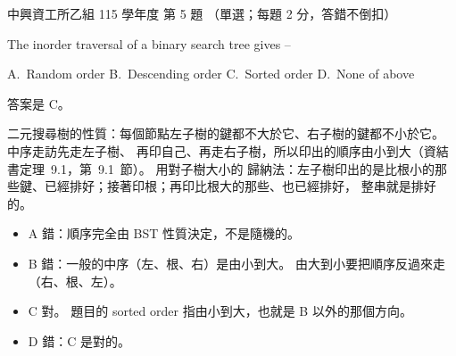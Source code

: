 \begin{pastexam}[label={px:nchu-115-is-05}]{中興資工所乙組 115 學年度 第 5 題}
（單選；每題 2 分，答錯不倒扣）

The inorder traversal of a binary search tree gives --

A.~Random order \qquad B.~Descending order \qquad C.~Sorted order \qquad D.~None of above
\end{pastexam}

\begin{pastsoln}
答案是 C。

二元搜尋樹的性質：每個節點左子樹的鍵都不大於它、右子樹的鍵都不小於它。 中序走訪先走左子樹、
再印自己、再走右子樹，所以印出的順序由小到大（資結書定理~9.1，第~9.1~節）。 用對子樹大小的
歸納法：左子樹印出的是比根小的那些鍵、已經排好；接著印根；再印比根大的那些、也已經排好，
整串就是排好的。
\begin{itemize}
\item A 錯：順序完全由 BST 性質決定，不是隨機的。
\item B 錯：一般的中序（左、根、右）是由小到大。 由大到小要把順序反過來走（右、根、左）。
\item C 對。 題目的 sorted order 指由小到大，也就是 B 以外的那個方向。
\item D 錯：C 是對的。
\end{itemize}
\end{pastsoln}
